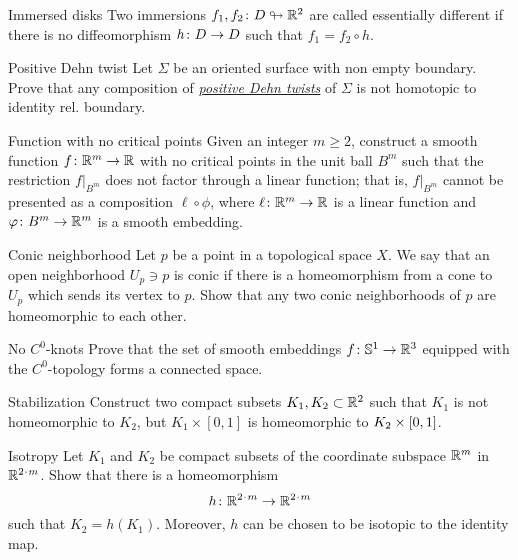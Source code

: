 \documentclass[twoside]{book}
\begin{document}
{\begin{pr}{}{Immersed disks}
Two immersions $f_1,f_2\colon D\looparrowright \mathbb{R}^2$ are called essentially different 
if there is no diffeomorphism $h\:D\z\to D$ such that
$f_1=f_2\circ h$.
\end{pr}

\begin{pr}{\easy}{Positive Dehn twist}\label{Positive Dehn twist} Let $\Sigma$ be an oriented surface with non empty boundary.
Prove that any composition of \hyperref[Dehn twist]{\emph{positive Dehn twists}} of $\Sigma$ is not homotopic to identity rel. boundary.
\end{pr}

\begin{pr}{}{Function with no critical points}\label{Function with no critical points}
Given an integer $m\ge 2$, 
construct a smooth function $f\colon\mathbb{R}^m\to \mathbb{R}$ 
with no critical points in the unit ball $B^m$ 
such that the restriction $f|_{B^m}$ does not factor through a linear function;
that is, 
$f|_{B^m}$ cannot be presented as a composition
$\ell\circ\phi$,
where $\ell\colon\mathbb{R}^m\to\mathbb{R}$ is a linear function 
and $\varphi\colon B^m\to\mathbb{R}^m$ is a smooth embedding.
\end{pr}

\begin{pr}{}{Conic neighborhood}\label{Conic neighborhood}  
Let $p$ be a point in a topological space $X$.
We say that an open neighborhood $U_p\ni p$ is conic
if there is a homeomorphism from a cone
to $U_p$ which sends its vertex to $p$.
Show that any two conic neighborhoods of $p$ are homeomorphic to each other.
\end{pr}

\begin{pr}{}{No $C^0$-knots}\label{No knots}
Prove that the set of smooth embeddings $f\:\mathbb{S}^1\z\to\RR^3$ equipped with the $C^0$-topology 
forms a connected space.
\end{pr}

\begin{pr}{}{Stabilization}\label{Simple stabilization}
Construct two compact subsets $K_1, K_2\subset\mathbb{R}^2$ such that
$K_1$ is not homeomorphic to $K_2$, but $K_1\times[0,1]$ is homeomorphic to $K_2\z\times[0,1]$.
\end{pr}

\begin{pr}{}{Isotropy}\label{Isotropy}
Let $K_1$ and $K_2$ be compact subsets of the coordinate subspace $\mathbb{R}^m$ in $\RR^{2\cdot m}$.
Show that there is a homeomorphism 
\[h\:\RR^{2\cdot m}\z\to \RR^{2\cdot m}\] 
such that $K_2=h(K_1)$.
Moreover, $h$ can be chosen to be isotopic to the identity map.
\end{pr}



}
\end{document}
